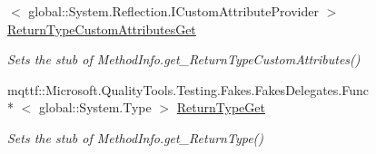\begin{DoxyCompactItemize}
$<$ global\-::\-System.\-Reflection.\-I\-Custom\-Attribute\-Provider $>$ \hyperlink{class_system_1_1_reflection_1_1_fakes_1_1_stub_method_info_ab67e101e89c1c400730817cda6b1ed7f}{Return\-Type\-Custom\-Attributes\-Get}
\begin{DoxyCompactList}\small\item\em Sets the stub of Method\-Info.\-get\-\_\-\-Return\-Type\-Custom\-Attributes()\end{DoxyCompactList}\item 
mqttf\-::\-Microsoft.\-Quality\-Tools.\-Testing.\-Fakes.\-Fakes\-Delegates.\-Func\\*
$<$ global\-::\-System.\-Type $>$ \hyperlink{class_system_1_1_reflection_1_1_fakes_1_1_stub_method_info_af481b3b8dbe517c72430b0aa66a55a6b}{Return\-Type\-Get}
\begin{DoxyCompactList}\small\item\em Sets the stub of Method\-Info.\-get\-\_\-\-Return\-Type()\end{DoxyCompactList}\end{DoxyCompactItemize}
